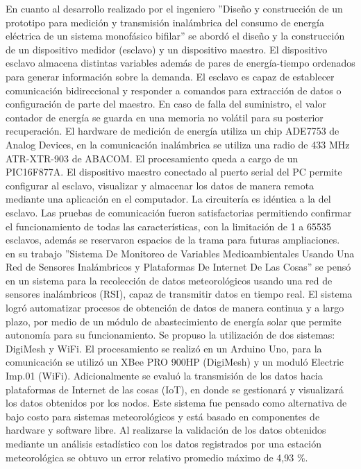 \documentclass[12pt,letterpaper]{article}
\begin{document}
En cuanto al desarrollo realizado por el ingeniero \cite{DA2006} ”Diseño y construcción de un prototipo para medición y transmisión inalámbrica del consumo de energía eléctrica de un sistema monofásico bifilar” se abordó el diseño y la construcción de un dispositivo medidor (esclavo) y un dispositivo maestro. El dispositivo esclavo almacena distintas variables además de pares de energía-tiempo ordenados para generar información sobre la demanda. El esclavo es capaz de establecer comunicación bidireccional y responder a comandos para extracción de datos o configuración de parte del maestro. En caso de falla del suministro, el valor contador de energía se guarda en una memoria no volátil para su posterior recuperación. El hardware de medición de energía utiliza un chip ADE7753 de Analog Devices, en la comunicación inalámbrica se utiliza una radio de 433 MHz ATR-XTR-903 de ABACOM. El procesamiento queda a cargo de un PIC16F877A. El dispositivo maestro conectado al puerto serial del PC permite configurar al esclavo, visualizar y almacenar los datos de manera remota mediante una aplicación en el computador. La circuitería es idéntica a la del esclavo. Las pruebas de comunicación fueron satisfactorias permitiendo confirmar el funcionamiento de todas las características, con la limitación de 1 a 65535 esclavos, además se reservaron espacios de la trama para futuras ampliaciones.\\



\cite{QCGJ2018} en su trabajo ”Sistema De Monitoreo de Variables Medioambientales Usando Una Red de Sensores Inalámbricos y Plataformas De Internet De Las Cosas” se pensó en un sistema para la recolección de datos meteorológicos usando una red de sensores inalámbricos (RSI), capaz de transmitir datos en tiempo real. El sistema logró automatizar procesos de obtención de datos de manera continua y a largo plazo, por medio de un módulo de abastecimiento de energía solar que permite autonomía para su funcionamiento. Se propuso la utilización de dos sistemas: DigiMesh y WiFi. El procesamiento se realizó en un Arduino Uno, para la comunicación se utilizó un XBee PRO 900HP (DigiMesh) y un moduló Electric Imp.01 (WiFi). Adicionalmente se evaluó la transmisión de los datos hacia plataformas de Internet de las cosas (IoT), en donde se gestionará y visualizará los datos obtenidos por los nodos. Este sistema fue pensado como alternativa de bajo costo para sistemas meteorológicos y está basado en componentes de hardware y software libre. Al realizarse la validación de los datos obtenidos mediante un análisis estadístico con los datos registrados por una estación meteorológica se obtuvo un error relativo promedio máximo de 4,93 \%.\\
\end{document}
